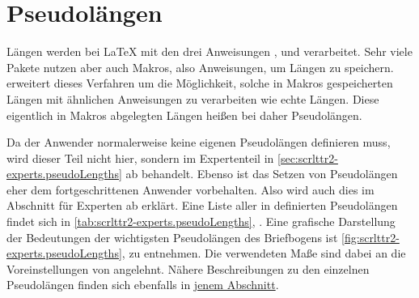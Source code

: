 \section{Pseudolängen}
\BeginIndexGroup
{}

Längen werden bei \LaTeX{} mit den drei Anweisungen
, 
und  verarbeitet. Sehr viele Pakete
nutzen aber auch Makros, also Anweisungen, um Längen zu
speichern. \KOMAScript{} erweitert dieses Verfahren um die Möglichkeit, solche
in Makros gespeicherten Längen mit ähnlichen Anweisungen zu verarbeiten wie
echte Längen. Diese eigentlich in Makros abgelegten Längen heißen bei
\KOMAScript{} daher Pseudolängen.

Da der Anwender normalerweise keine eigenen Pseudolängen definieren muss, wird
dieser Teil nicht hier, sondern im Expertenteil in
\autoref{sec:scrlttr2-experts.pseudoLengths} ab
 behandelt. Ebenso ist das Setzen
von Pseudolängen eher dem fortgeschrittenen Anwender vorbehalten. Also wird
auch dies im Abschnitt für Experten ab
 erklärt.  Eine Liste aller in
 definierten Pseudolängen findet sich in
\autoref{tab:scrlttr2-experts.pseudoLengths},
. Eine grafische Darstellung
der Bedeutungen der wichtigsten Pseudolängen des Briefbogens ist
\autoref{fig:scrlttr2-experts.pseudoLengths},
 zu entnehmen. Die verwendeten
Maße sind dabei an die Voreinstellungen von  angelehnt. Nähere
Beschreibungen zu den einzelnen Pseudolängen finden sich ebenfalls in
\hyperref[sec:scrlttr2-experts.pseudoLength]{jenem Abschnitt}.%
\EndIndexGroup





